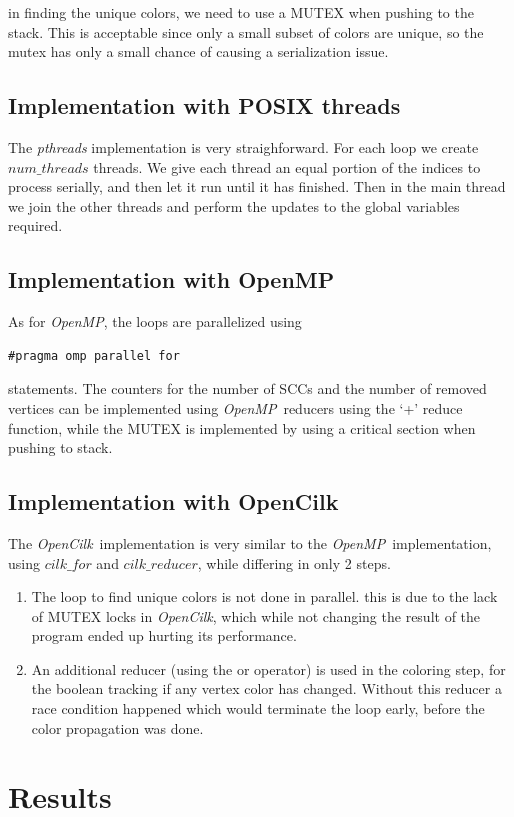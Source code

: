 \documentclass[10pt, a4paper]{article}
\newcommand{\cilk}{\textit{OpenCilk}}
\newcommand{\omp}{\textit{OpenMP}}
\begin{document}
in finding the unique colors, we need to use a MUTEX when pushing to the stack. This is acceptable since
only a small subset of colors are unique, so the mutex has only a small chance of causing a serialization issue.

\subsection{Implementation with POSIX threads}
The \textit{pthreads} implementation is very straighforward. For each loop we create $num\_threads$ threads. 
We give each thread an equal portion of the indices to process serially, and then let it run until it 
has finished.  Then in the main thread we join the other threads and perform the updates to the global 
variables required.

\subsection{Implementation with OpenMP}
As for \omp, the loops are parallelized using 
\begin{verbatim}
#pragma omp parallel for
\end{verbatim}
statements. The counters for the number of SCCs and the number of removed vertices can be implemented using
\omp \ reducers using the `+' reduce function, while the MUTEX is implemented by using a critical section when
pushing to stack.

\subsection{Implementation with OpenCilk}
The \cilk \ implementation is very similar to the \omp \ implementation, using $cilk\_for$ and $cilk\_reducer$, 
while differing in only 2 steps.

\begin{enumerate}
	\item The loop to find unique colors is not done in parallel. this is due to the lack of MUTEX locks
		in \cilk, which while not changing the result of the program ended up hurting its performance.
	\item An additional reducer (using the or operator) is used in the coloring step, for the boolean tracking 
		if any vertex color has changed. Without this reducer a race condition happened which would terminate
		the loop early, before the color propagation was done.
\end{enumerate}

\section{Results}
\end{document}

